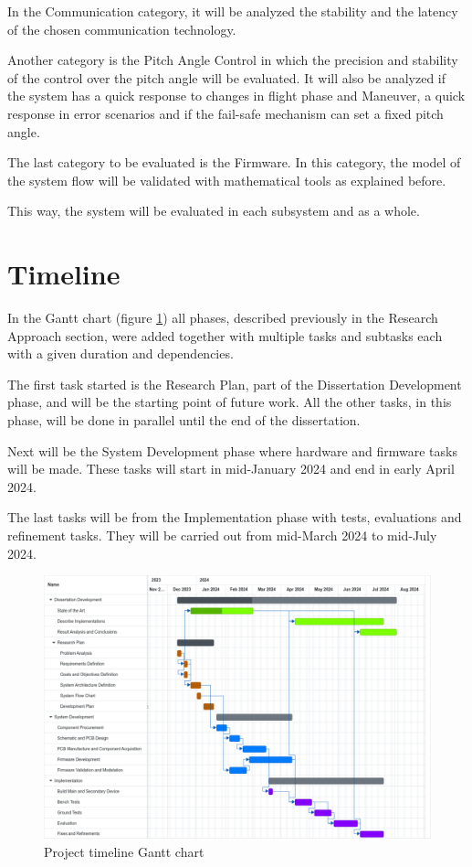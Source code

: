 In the Communication category, it will be analyzed the stability and the latency of the chosen communication technology.

Another category is the Pitch Angle Control in which the precision and stability of the control over the pitch angle will be evaluated.
It will also be analyzed if the system has a quick response to changes in flight phase and Maneuver, a quick response in error scenarios and if the fail-safe mechanism can set a fixed pitch angle.

The last category to be evaluated is the Firmware.
In this category, the model of the system flow will be validated with mathematical tools as explained before.

This way, the system will be evaluated in each subsystem and as a whole.


\section{Timeline}
In the Gantt chart (figure \ref{fig:gantt}) all phases, described previously in the Research Approach section, were added together with multiple tasks and subtasks each with a given duration and dependencies.

The first task started is the Research Plan, part of the Dissertation Development phase, and will be the starting point of future work.
All the other tasks, in this phase, will be done in parallel until the end of the dissertation.

Next will be the System Development phase where hardware and firmware tasks will be made.
These tasks will start in mid-January 2024 and end in early April 2024.

The last tasks will be from the Implementation phase with tests, evaluations and refinement tasks.
They will be carried out from mid-March 2024 to mid-July 2024.

\begin{figure}[H]
    \centering
    \includegraphics[width=\textwidth,keepaspectratio]{ch5/assets/gantt.pdf}
    \caption{Project timeline Gantt chart}
    \label{fig:gantt}
\end{figure}

